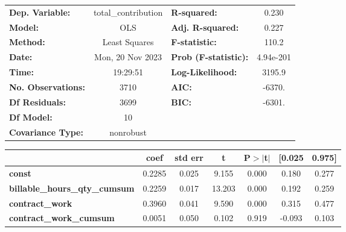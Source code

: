 \begin{center}
\begin{tabular}{lclc}
\toprule
\textbf{Dep. Variable:}                  & total\_contribution & \textbf{  R-squared:         } &     0.230   \\
\textbf{Model:}                          &         OLS         & \textbf{  Adj. R-squared:    } &     0.227   \\
\textbf{Method:}                         &    Least Squares    & \textbf{  F-statistic:       } &     110.2   \\
\textbf{Date:}                           &   Mon, 20 Nov 2023  & \textbf{  Prob (F-statistic):} & 4.94e-201   \\
\textbf{Time:}                           &       19:29:51      & \textbf{  Log-Likelihood:    } &    3195.9   \\
\textbf{No. Observations:}               &          3710       & \textbf{  AIC:               } &    -6370.   \\
\textbf{Df Residuals:}                   &          3699       & \textbf{  BIC:               } &    -6301.   \\
\textbf{Df Model:}                       &            10       & \textbf{                     } &             \\
\textbf{Covariance Type:}                &      nonrobust      & \textbf{                     } &             \\
\bottomrule
\end{tabular}
\begin{tabular}{lcccccc}
                                         & \textbf{coef} & \textbf{std err} & \textbf{t} & \textbf{P$> |$t$|$} & \textbf{[0.025} & \textbf{0.975]}  \\
\midrule
\textbf{const}                           &       0.2285  &        0.025     &     9.155  &         0.000        &        0.180    &        0.277     \\
\textbf{billable\_hours\_qty\_cumsum}    &       0.2259  &        0.017     &    13.203  &         0.000        &        0.192    &        0.259     \\
\textbf{contract\_work}                  &       0.3960  &        0.041     &     9.590  &         0.000        &        0.315    &        0.477     \\
\textbf{contract\_work\_cumsum}          &       0.0051  &        0.050     &     0.102  &         0.919        &       -0.093    &        0.103     \\

\end{tabular}
\end{center}
